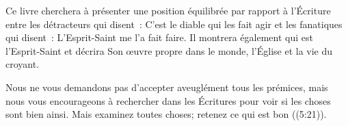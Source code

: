 Ce livre cherchera à présenter une position équilibrée par rapport à l'Écriture entre les détracteurs qui disent~: \og C'est le diable qui les fait agir \fg{} et les fanatiques qui disent~: \og L'Esprit-Saint me l'a fait faire. \fg{} Il montrera également qui est l'Esprit-Saint et décrira Son œuvre propre dans le monde, l'Église et la vie du croyant.

Nous ne vous demandons pas d'accepter aveuglément tous les prémices, mais nous vous encourageons à rechercher dans les Écritures pour voir si les choses sont bien ainsi. \og Mais examinez toutes choses; retenez ce qui est bon \fg{} ((5:21)).

